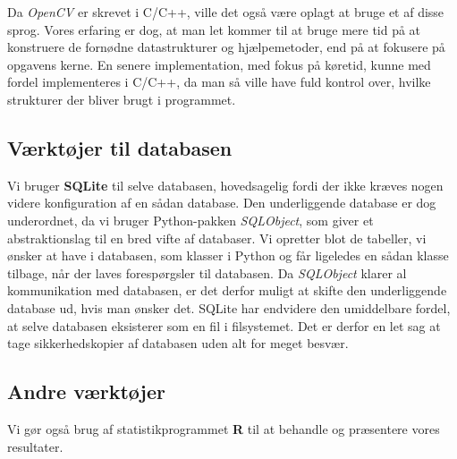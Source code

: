 {Da \emph{OpenCV} er skrevet i C/C++, ville det også være oplagt at bruge
et af disse sprog. Vores erfaring er dog, at man let kommer til at bruge
mere tid på at konstruere de fornødne datastrukturer og hjælpemetoder,
end på at fokusere på opgavens kerne. En senere implementation, med
fokus på køretid, kunne med fordel implementeres i C/C++, da man så
ville have fuld kontrol over, hvilke strukturer der bliver brugt i
programmet.

\subsection{Værktøjer til databasen}
Vi bruger \textbf{SQLite}\cite{Sqlite} til selve databasen, hovedsagelig
fordi der ikke kræves nogen videre konfiguration af en sådan database.
Den underliggende database er dog underordnet, da vi bruger
Python-pakken \emph{SQLObject}\cite{Sqlobject}, som giver et
abstraktionslag til en bred vifte af databaser. Vi opretter blot de
tabeller, vi ønsker at have i databasen, som klasser i Python og får
ligeledes en sådan klasse tilbage, når der laves forespørgsler til
databasen. Da \emph{SQLObject} klarer al kommunikation med databasen, er
det derfor muligt at skifte den underliggende database ud, hvis man
ønsker det. SQLite har endvidere den umiddelbare fordel, at selve
databasen eksisterer som en fil i filsystemet.  Det er derfor en let sag
at tage sikkerhedskopier af databasen uden alt for meget besvær.

\subsection{Andre værktøjer}
Vi gør også brug af statistikprogrammet \textbf{R}\cite{Rlang} til at
behandle og præsentere vores resultater.

}

